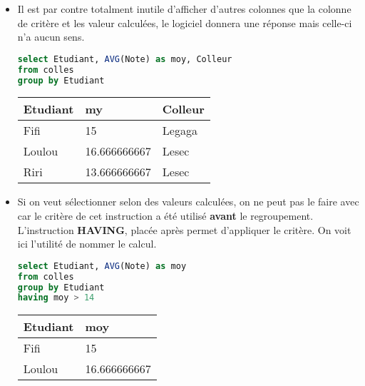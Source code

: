 \begin{itemize}
\vskip 1cm
\item
Il est par contre totalment inutile d'afficher d'autres colonnes que la colonne de critère et les valeur calculées, le logiciel donnera une réponse mais celle-ci n'a aucun sens.

\begin{lstlisting}[language=SQL]
select Etudiant, AVG(Note) as moy, Colleur
from colles
group by Etudiant
\end{lstlisting}

\begin{center}
\begin{tabular}[t]{|l|l|l|}
\hline
\bf Etudiant &\bf  my &\bf  Colleur \\ 
\hline
Fifi&15&Legaga\\
Loulou&16.666666667&Lesec\\
Riri&13.666666667&Lesec\\
\hline
\end{tabular}
\end{center}

\vskip 1cm
\item 
Si on veut sélectionner selon des valeurs calculées, on ne peut pas le faire avec  car le critère de cet instruction a été utilisé {\bf avant} le regroupement. L'instruction {\bf HAVING}, placée après  permet d'appliquer le critère. On voit ici l'utilité de nommer le calcul.

\begin{minipage}[t]{0.60\linewidth}
\begin{lstlisting}[language=SQL]
select Etudiant, AVG(Note) as moy
from colles
group by Etudiant
having moy > 14
\end{lstlisting}
\end{minipage}
\begin{minipage}[t]{0.35\linewidth}
\begin{center}
\begin{tabular}[t]{|l|l|}
\hline
\bf Etudiant &\bf moy \\ 
\hline
Fifi&15\\
Loulou&16.666666667\\
\hline
\end{tabular}
\end{center}
\end{minipage}
\end{itemize}
\newpage
